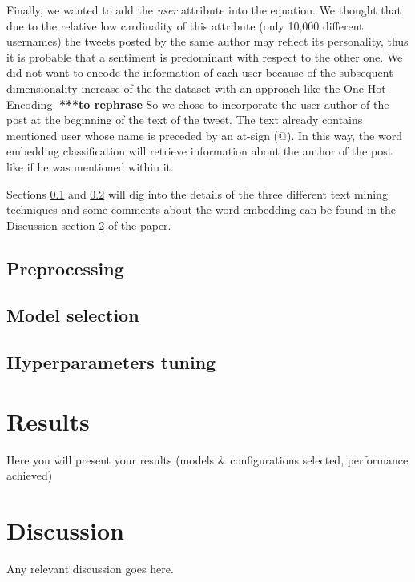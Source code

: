 \documentclass[conference]{IEEEtran}
\begin{document}
Finally, we wanted to add the \textit{user} attribute into the equation. We thought that due to the relative low cardinality of this attribute (only 10,000 different usernames) the tweets posted by the same author may reflect its personality, thus it is probable that a sentiment is predominant with respect to the other one. We did not want to encode the information of each user because of the subsequent dimensionality increase of the the dataset with an approach like the One-Hot-Encoding\cite{ohe}. \textbf{***to rephrase}
So we chose to incorporate the user author of the post at the beginning of the text of the tweet. The text already contains mentioned user whose name is preceded by an at-sign (@). In this way, the word embedding classification will retrieve information about the author of the post like if he was mentioned within it.

Sections \ref{sec:preprocessing} and \ref{sec:model} will dig into the details of the three different text mining techniques and some comments about the word embedding can be found in the Discussion section \ref{sec:discussion} of the paper.

\subsection{Preprocessing}\label{sec:preprocessing}
\subsection{Model selection}\label{sec:model}
\subsection{Hyperparameters tuning}\label{sec:hypertuning}

\section{Results}\label{sec:results}
Here you will present your results (models \& configurations selected, performance achieved)

\section{Discussion}\label{sec:discussion}
Any relevant discussion goes here.



\end{document}
